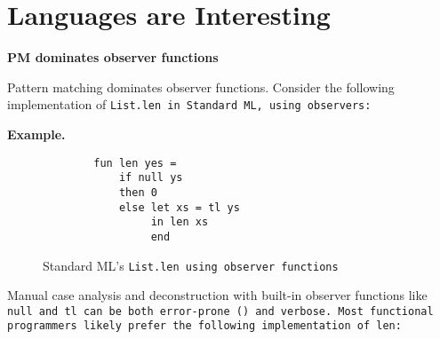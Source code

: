 \documentclass[manuscript,screen,review, 12pt]{acmart}
\begin{document}
\section{Languages are Interesting}
    \begin{outline}[enumerate]
     \bf{PM dominates observer functions}

    Pattern matching dominates observer functions. Consider the following
    implementation of \tt{List.len} in Standard ML, using observers:
    
    
    
    
    
    
     \bf{Example. }

    \begin{figure}[ht!]
        \centering
        \smllst
        \begin{lstlisting}
        fun len yes =
            if null ys 
            then 0 
            else let xs = tl ys 
                 in len xs 
                 end 
        \end{lstlisting}
    \caption{Standard ML's \tt{List.len} using observer functions}
    \label{fig:observerlen}
    \end{figure}
    
    Manual case analysis and deconstruction with built-in observer functions
    like \tt{null} and \tt{tl} can be both error-prone ()
    and verbose. Most functional programmers likely prefer the following
    implementation of \tt{len}:
    \begin{figure}[htt]
        

\end{figure}
\end{outline}
\end{document}
